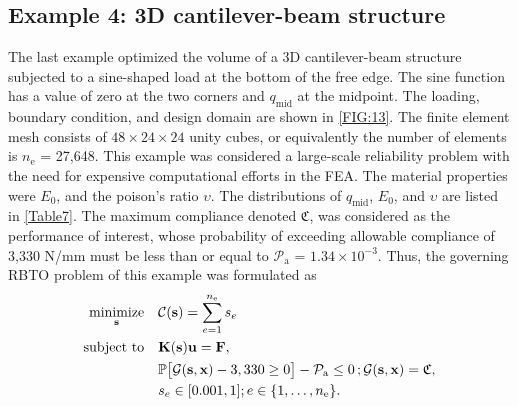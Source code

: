 \documentclass[preprint,3p]{elsarticle}
\begin{document}
\begin{linenumbers}
\subsection{Example 4: 3D cantilever-beam structure}\label{SUBSEC:44}
The last example optimized the volume of a 3D cantilever-beam structure subjected to a sine-shaped load at the bottom of the free edge. The sine function has a value of zero at the two corners and $q_\text{mid}$ at the midpoint. The loading, boundary condition, and design domain are shown in \cref{FIG:13}. The finite element mesh consists of $48 \times 24 \times 24$ unity cubes, or equivalently the number of elements is $n_\text{e}$ = 27,648. This example was considered a large-scale reliability problem with the need for expensive computational efforts in the FEA. The material properties were $E_0$, and the poison’s ratio $\upsilon$. The distributions of $q_\text{mid}$, $E_0$, and $\upsilon$ are listed in \cref{Table7}. The maximum compliance denoted $\mathfrak{C}$, was considered as the performance of interest, whose probability of exceeding allowable compliance of 3,330 N/mm must be less than or equal to $\mathcal{P}_\text{a}$ = $1.34\times10^{-3}$. Thus, the governing RBTO problem of this example was formulated as
\begin{equation}
    \begin{aligned}
        \underset{\textbf{s}}{\text{minimize}} \quad & \mathcal{C}(\textbf{s}) = \displaystyle\sum_{e=1}^{n_\text{e}} s_e\\
        \text{subject to} \quad &
        {\bf K(s)}{\bf u}={\bf F},\\
        &\mathbb{P}\bigl[\mathcal{G}(\textbf{s},\textbf{x})-3,330 \geq 0 \bigr]-\mathcal{P}_{\text{a}} \leq 0 \,; \mathcal{G}(\textbf{s},\textbf{x}) = \mathfrak{C},\\
        &s_e \in [0.001,1]; e \in \{1,\dots,n_\text{e}\}.
    \end{aligned}
    \label{EQ:29}
\end{equation}


\end{linenumbers}
\end{document}
